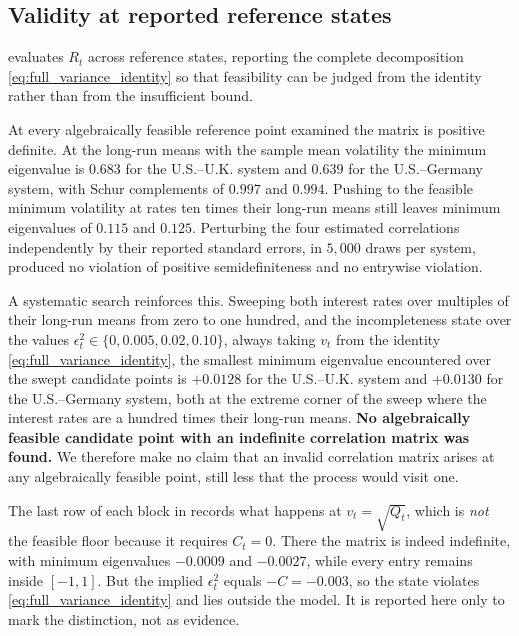 \documentclass[11pt]{article}
\theoremstyle{definition}
\begin{document}
\subsection{Validity at reported reference states}\label{app:psd_reported}

 evaluates $R_t$ across reference states, reporting the complete decomposition \eqref{eq:full_variance_identity} so that feasibility can be judged from the identity rather than from the insufficient bound.

At every algebraically feasible reference point examined the matrix is positive definite. At the long-run means with the sample mean volatility the minimum eigenvalue is $0.683$ for the U.S.--U.K. system and $0.639$ for the U.S.--Germany system, with Schur complements of $0.997$ and $0.994$. Pushing to the feasible minimum volatility at rates ten times their long-run means still leaves minimum eigenvalues of $0.115$ and $0.125$. Perturbing the four estimated correlations independently by their reported standard errors, in $5{,}000$ draws per system, produced no violation of positive semidefiniteness and no entrywise violation.

A systematic search reinforces this. Sweeping both interest rates over multiples of their long-run means from zero to one hundred, and the incompleteness state over the values $\epsilon_t^2\in\{0,0.005,0.02,0.10\}$, always taking $v_t$ from the identity \eqref{eq:full_variance_identity}, the smallest minimum eigenvalue encountered over the swept candidate points is $+0.0128$ for the U.S.--U.K. system and $+0.0130$ for the U.S.--Germany system, both at the extreme corner of the sweep where the interest rates are a hundred times their long-run means. \textbf{No algebraically feasible candidate point with an indefinite correlation matrix was found.} We therefore make no claim that an invalid correlation matrix arises at any algebraically feasible point, still less that the process would visit one.

The last row of each block in  records what happens at $v_t=\sqrt{Q_t}$, which is \emph{not} the feasible floor because it requires $C_t=0$. There the matrix is indeed indefinite, with minimum eigenvalues $-0.0009$ and $-0.0027$, while every entry remains inside $[-1,1]$. But the implied $\epsilon_t^2$ equals $-C=-0.003$, so the state violates \eqref{eq:full_variance_identity} and lies outside the model. It is reported here only to mark the distinction, not as evidence.
\end{document}
